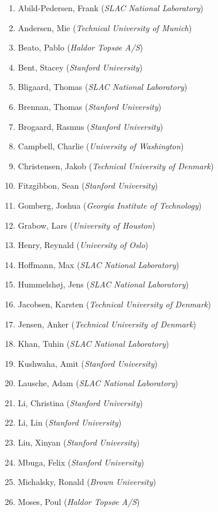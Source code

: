 \begin{enumerate}
\def\labelenumi{\arabic{enumi}.}
\itemsep1pt\parskip0pt
\item
  Abild-Pedersen, Frank (\emph{SLAC National Laboratory})
\item
  Andersen, Mie (\emph{Technical University of Munich})
\item
  Beato, Pablo (\emph{Haldor Topsøe A/S})
\item
  Bent, Stacey (\emph{Stanford University})
\item
  Bligaard, Thomas (\emph{SLAC National Laboratory})
\item
  Brennan, Thomas (\emph{Stanford University})
\item
  Brogaard, Rasmus (\emph{Stanford University})
\item
  Campbell, Charlie (\emph{University of Washington})
\item
  Christensen, Jakob (\emph{Technical University of Denmark})
\item
  Fitzgibbon, Sean (\emph{Stanford University})
\item
  Gomberg, Joshua (\emph{Georgia Institute of Technology})
\item
  Grabow, Lars (\emph{University of Houston})
\item
  Henry, Reynald (\emph{University of Oslo})
\item
  Hoffmann, Max (\emph{SLAC National Laboratory})
\item
  Hummelshøj, Jens (\emph{SLAC National Laboratory})
\item
  Jacobsen, Karsten (\emph{Technical University of Denmark})
\item
  Jensen, Anker (\emph{Technical University of Denmark})
\item
  Khan, Tuhin (\emph{SLAC National Laboratory})
\item
  Kushwaha, Amit (\emph{Stanford University})
\item
  Lausche, Adam (\emph{SLAC National Laboratory})
\item
  Li, Christina (\emph{Stanford University})
\item
  Li, Lin (\emph{Stanford University})
\item
  Liu, Xinyan (\emph{Stanford University})
\item
  Mbuga, Felix (\emph{Stanford University})
\item
  Michalsky, Ronald (\emph{Brown University})
\item
  Moses, Poul (\emph{Haldor Topsøe A/S})

\end{enumerate}
